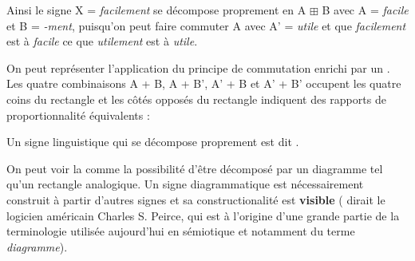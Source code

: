 Ainsi le signe X = \textit{facilement} se décompose proprement en A ${\boxplus}$ B avec A = \textit{facile} et B = \textit{{}-ment}, puisqu’on peut faire commuter A avec A’ = \textit{utile} et que \textit{facilement} est à \textit{facile} ce que \textit{utilement} est à \textit{utile}.

On peut représenter l’application du principe de commutation enrichi par un . Les quatre combinaisons A + B, A + B’, A’ + B et A’ + B’ occupent les quatre coins du rectangle et les côtés opposés du rectangle indiquent des rapports de proportionnalité équivalents :

\begin{figure}
\caption{\label{fig:}}
\end{figure}


\begin{styleLivreImportant}
Un signe linguistique qui se décompose proprement est dit .
\end{styleLivreImportant}

On peut voir la  comme la possibilité d’être décomposé par un diagramme tel qu’un rectangle analogique. Un signe diagrammatique est nécessairement construit à partir d’autres signes et sa constructionalité est \textbf{visible} ( dirait le logicien américain Charles S. Peirce, qui est à l’origine d’une grande partie de la terminologie utilisée aujourd’hui en sémiotique et notamment du terme \textit{diagramme}).

